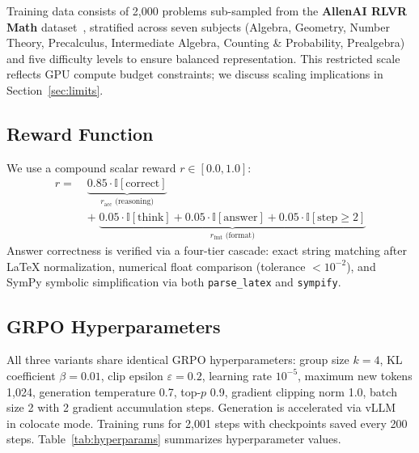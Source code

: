 \documentclass{article}
\begin{document}
Training data consists of 2{,}000 problems sub-sampled from the \textbf{AllenAI RLVR Math} dataset~\cite{allenairlvr2025}, stratified across seven subjects (Algebra, Geometry, Number Theory, Precalculus, Intermediate Algebra, Counting \& Probability, Prealgebra) and five difficulty levels to ensure balanced representation. This restricted scale reflects GPU compute budget constraints; we discuss scaling implications in Section~\ref{sec:limits}.

\subsection{Reward Function}

We use a compound scalar reward $r \in [0.0, 1.0]$:
\begin{equation}
\begin{aligned}
r =\;& \underbrace{0.85 \cdot \mathbb{I}[\text{correct}]}_{r_\text{acc}\text{ (reasoning)}} \\
&+\; \underbrace{0.05 \cdot \mathbb{I}[\text{think}] + 0.05 \cdot \mathbb{I}[\text{answer}] + 0.05 \cdot \mathbb{I}[\text{step}\ge 2]}_{r_\text{fmt}\text{ (format)}}
\end{aligned}
\label{eq:reward}
\end{equation}
Answer correctness is verified via a four-tier cascade: exact string matching after LaTeX normalization, numerical float comparison (tolerance $< 10^{-2}$), and SymPy symbolic simplification via both \texttt{parse\_latex} and \texttt{sympify}.

\subsection{GRPO Hyperparameters}

All three variants share identical GRPO hyperparameters: group size $k=4$, KL coefficient $\beta=0.01$, clip epsilon $\varepsilon=0.2$, learning rate $10^{-5}$, maximum new tokens 1{,}024, generation temperature 0.7, top-$p$ 0.9, gradient clipping norm 1.0, batch size 2 with 2 gradient accumulation steps. Generation is accelerated via vLLM~\cite{kwon2023efficientmemorymanagementlarge} in colocate mode. Training runs for 2{,}001 steps with checkpoints saved every 200 steps. Table~\ref{tab:hyperparams} summarizes hyperparameter values.
\end{document}
